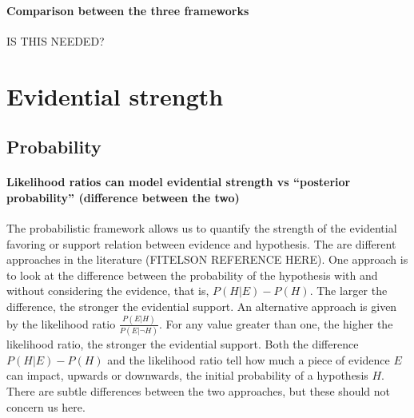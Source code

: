\documentclass[10pt]{article}
\begin{document}
\paragraph{Comparison between the three frameworks} IS THIS NEEDED?




\section{Evidential strength}

\subsection{Probability}


\paragraph{Likelihood ratios can model evidential strength vs ``posterior probability'' (difference between the two)}

The probabilistic framework allows us to quantify the strength of the evidential favoring or support relation between evidence and hypothesis. 
The are different approaches in the literature (FITELSON REFERENCE HERE). 
One approach is to look at the difference between the probability of the hypothesis with and without considering the evidence, that is, $P(H | E) - P(H)$.
The larger the difference, the stronger the evidential support. 
An alternative approach is given by the likelihood ratio $\frac{P(E|H)}{P(E| \neg H)}$. 
For any value greater than one,  the higher the likelihood ratio, 
the stronger the evidential support. %
%
%
Both the difference $P(H|E) - P(H)$ and the likelihood ratio tell 
how much a piece of evidence $E$ can impact, upwards or downwards, 
the initial probability of a hypothesis $H$. There are subtle differences between the two approaches, 
but these should not concern us here.
\end{document}
